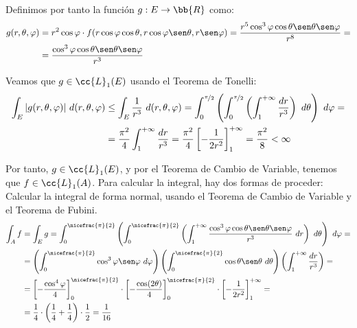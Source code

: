 \begin{ejercicio}
\begin{enumerate}
        Definimos por tanto la función $g: E \to \bb{R}$ como:
        \begin{align*}
            g(r, \theta, \varphi) &= r^2\cos\varphi\cdot f(r\cos\varphi\cos\theta, r\cos\varphi\sen\theta, r\sen\varphi)
            = \frac{r^5\cos^3\varphi\cos\theta\sen\theta\sen\varphi}{r^8} =\\
            &= \frac{\cos^3\varphi\cos\theta\sen\theta\sen\varphi}{r^3}
        \end{align*}

        Veamos que $g\in \cc{L}_1(E)$ usando el Teorema de Tonelli:
        \begin{align*}
            \int_E |g(r, \theta, \varphi)|~d(r, \theta, \varphi)
            &\leq \int_E \frac{1}{r^3}~d(r, \theta, \varphi)
            = \int_{0}^{\nicefrac{\pi}{2}} \left( \int_{0}^{\nicefrac{\pi}{2}} \left( \int_1^{+\infty} \frac{dr}{r^3} \right)~d\theta \right)~d\varphi
            =\\&= \frac{\pi^2}{4} \int_{1}^{+\infty} \frac{dr}{r^3}
            = \frac{\pi^2}{4} \left[ -\frac{1}{2r^2} \right]_1^{+\infty} = \frac{\pi^2}{8} < \infty
        \end{align*}

        Por tanto, $g\in \cc{L}_1(E)$, y por el Teorema de Cambio de Variable, tenemos que $f\in \cc{L}_1(A)$. Para calcular la integral, hay dos formas de proceder:
        Calcular la integral de forma normal, usando el Teorema de Cambio de Variable y el Teorema de Fubini.
        \begin{align*}
            \int_A f &= \int_E g = \int_{0}^{\nicefrac{\pi}{2}} \left( \int_{0}^{\nicefrac{\pi}{2}} \left( \int_1^{+\infty} \frac{\cos^3\varphi\cos\theta\sen\theta\sen\varphi}{r^3}~dr \right)~d\theta \right)~d\varphi =\\
            &= \left( \int_{0}^{\nicefrac{\pi}{2}} \cos^3\varphi\sen\varphi~d\varphi \right) \left( \int_{0}^{\nicefrac{\pi}{2}} \cos\theta\sen\theta~d\theta \right) \left( \int_1^{+\infty} \frac{dr}{r^3} \right) =\\
            &= \left[-\dfrac{\cos^4\varphi}{4}\right]_{0}^{\nicefrac{\pi}{2}} \cdot \left[-\dfrac{\cos(2\theta)}{4}\right]_{0}^{\nicefrac{\pi}{2}} \cdot \left[-\dfrac{1}{2r^2}\right]_1^{+\infty} =\\
            &= \frac{1}{4} \cdot \left(\frac{1}{4}+\frac{1}{4}\right) \cdot \dfrac{1}{2} = \frac{1}{16}
        \end{align*}

        \begin{comment}


\end{comment}
\end{enumerate}
\end{ejercicio}
